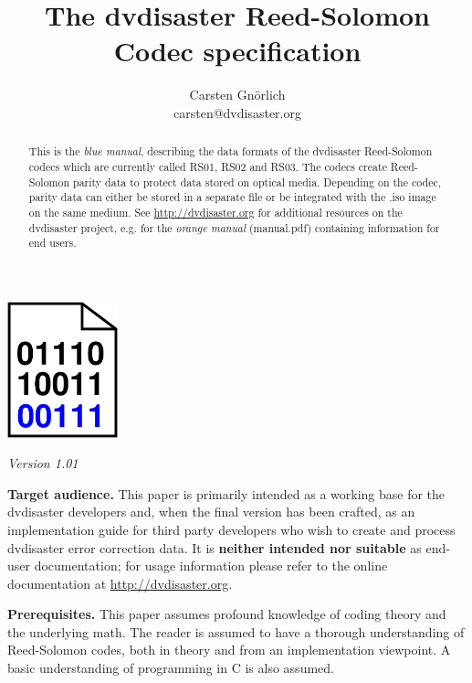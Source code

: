 \documentclass[12pt,a4paper,twoside]{article}
\newcommand{\paperversion}{{\em Version 1.01}}
\begin{document}
\pagecolor{lightblue}
\title{The dvdisaster Reed-Solomon Codec specification}
\author{Carsten Gnörlich\\carsten@dvdisaster.org}
\date{}
\maketitle
\thispagestyle{empty}

\centerline{\includegraphics[width=32mm]{title.eps}}
  
\begin{center}
\paperversion
\end{center}

\bigskip

\begin{abstract}
This is the {\em blue manual}, describing the data formats of the dvdisaster
Reed-Solomon codecs which are currently called RS01, RS02 and RS03.
The codecs create Reed-Solomon parity data to protect data stored on optical media.
Depending on the codec, parity data can either be stored in a separate file 
or be integrated with the .iso image on the same medium. 
See \url{http://dvdisaster.org}  for additional resources on the dvdisaster project,
e.g. for the {\em orange manual} (manual.pdf) containing information for end users.
\end{abstract}

\bigskip

{\bf Target audience.} This paper is primarily intended as a working base for the
dvdisaster developers and, when the final version has been crafted, as an implementation
guide for third party developers who wish to create and process dvdisaster error correction data.
It is {\bf neither intended nor suitable} as end-user documentation; for usage information
please refer to the online documentation at \url{http://dvdisaster.org}.

\bigskip

{\bf Prerequisites.} This paper assumes profound knowledge of coding theory and the 
underlying math. The reader is assumed to have a thorough understanding of Reed-Solomon
codes, both in theory and from an implementation viewpoint. A basic understanding
of programming in C is also assumed.
\end{document}
